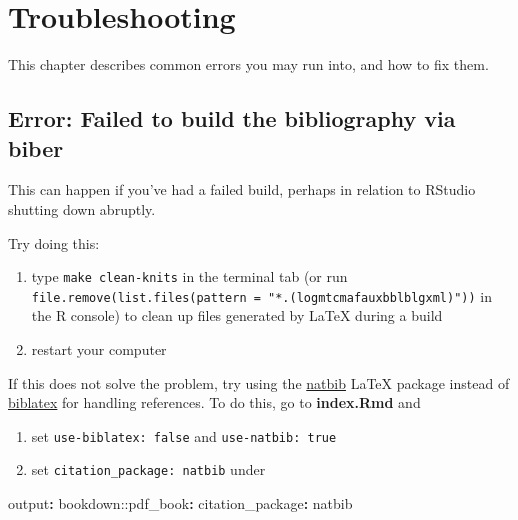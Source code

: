 \documentclass[a4paper,nobind]{templates/ociamthesis}
\providecommand{\tightlist}{%
  \setlength{\itemsep}{0pt}\setlength{\parskip}{0pt}}
\newenvironment{Shaded}{\begin{snugshade}}{\end{snugshade}}
\newcommand{\AttributeTok}[1]{\textcolor[rgb]{0.77,0.63,0.00}{#1}}
\newcommand{\FunctionTok}[1]{\textcolor[rgb]{0.00,0.00,0.00}{#1}}
\newcommand{\KeywordTok}[1]{\textcolor[rgb]{0.13,0.29,0.53}{\textbf{#1}}}
\renewenvironment{Shaded}
{
  \vspace{10pt}%
  \begin{snugshade}%
}{%
  \end{snugshade}%
  \vspace{8pt}%
}
\begin{document}
\hypertarget{troubleshooting}{%
\chapter{Troubleshooting}\label{troubleshooting}}

This chapter describes common errors you may run into, and how to fix them.

\hypertarget{error-failed-to-build-the-bibliography-via-biber}{%
\section{Error: Failed to build the bibliography via biber}\label{error-failed-to-build-the-bibliography-via-biber}}

This can happen if you've had a failed build, perhaps in relation to RStudio shutting down abruptly.

Try doing this:

\begin{enumerate}
\def\labelenumi{\arabic{enumi}.}
\tightlist
\item
  type \texttt{make\ clean-knits} in the terminal tab (or run \texttt{file.remove(list.files(pattern\ =\ "*.(log\textbar{}mtc\textbar{}maf\textbar{}aux\textbar{}bbl\textbar{}blg\textbar{}xml)"))} in the R console) to clean up files generated by LaTeX during a build
\item
  restart your computer
\end{enumerate}

If this does not solve the problem, try using the \href{https://www.overleaf.com/learn/latex/Bibliography_management_with_natbib}{natbib} LaTeX package instead of \href{https://www.overleaf.com/learn/latex/Articles/Getting_started_with_BibLaTeX}{biblatex} for handling references.
To do this, go to \textbf{index.Rmd} and

\begin{enumerate}
\def\labelenumi{\arabic{enumi}.}
\tightlist
\item
  set \texttt{use-biblatex:\ false} and \texttt{use-natbib:\ true}
\item
  set \texttt{citation\_package:\ natbib} under
\end{enumerate}

\begin{Shaded}
\begin{Highlighting}[]
\FunctionTok{output}\KeywordTok{:}
\AttributeTok{  bookdown:}\FunctionTok{:pdf\_book}\KeywordTok{:}
\AttributeTok{    }\FunctionTok{citation\_package}\KeywordTok{:}\AttributeTok{ natbib}
\end{Highlighting}
\end{Shaded}
\end{document}
